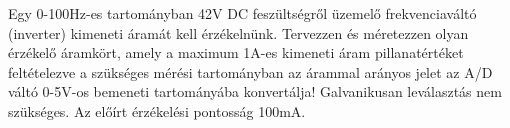 \begin{example}

Egy 0-100Hz-es tartományban 42V DC feszültségről üzemelő frekvenciaváltó (inverter) kimeneti áramát kell érzékelnünk. Tervezzen és méretezzen olyan érzékelő áramkört, amely a maximum 1A-es kimeneti áram pillanatértéket feltételezve a szükséges mérési tartományban az árammal arányos jelet az A/D váltó 0-5V-os bemeneti tartományába konvertálja! Galvanikusan leválasztás nem szükséges. Az előírt érzékelési pontosság 100mA.

\tcbline
\vspace{1mm}

\solution

\end{example}